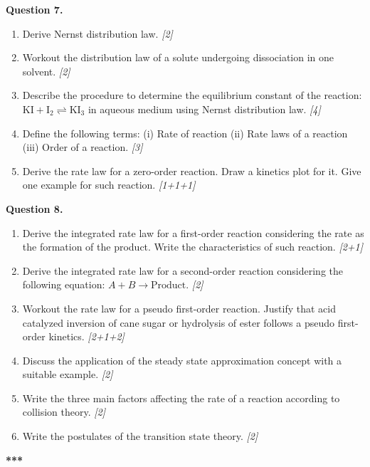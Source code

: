 \documentclass[11pt,a4paper]{article}
\newcommand{\pts}[1]{\hfill \textit{[#1]}}
\begin{document}
\noindent \textbf{Question 7.}
\begin{enumerate}[label=(\alph*)]
  \item Derive Nernst distribution law. \pts{2}
  \item Workout the distribution law of a solute undergoing dissociation in one solvent. \pts{2}
  \item Describe the procedure to determine the equilibrium constant of the reaction: $\text{KI} + \text{I}_2 \rightleftharpoons \text{KI}_3$ in aqueous medium using Nernst distribution law. \pts{4}
  \item Define the following terms: (i) Rate of reaction (ii) Rate laws of a reaction (iii) Order of a reaction. \pts{3}
  \item Derive the rate law for a zero-order reaction. Draw a kinetics plot for it. Give one example for such reaction. \pts{1+1+1}
\end{enumerate}

\bigskip

\noindent \textbf{Question 8.}
\begin{enumerate}[label=(\alph*)]
  \item Derive the integrated rate law for a first-order reaction considering the rate as the formation of the product. Write the characteristics of such reaction. \pts{2+1}
  \item Derive the integrated rate law for a second-order reaction considering the following equation: $A + B \rightarrow \text{Product}$. \pts{2}
  \item Workout the rate law for a pseudo first-order reaction. Justify that acid catalyzed inversion of cane sugar or hydrolysis of ester follows a pseudo first-order kinetics. \pts{2+1+2}
  \item Discuss the application of the steady state approximation concept with a suitable example. \pts{2}
  \item Write the three main factors affecting the rate of a reaction according to collision theory. \pts{2}
  \item Write the postulates of the transition state theory. \pts{2}
\end{enumerate}

\bigskip
\begin{center}
  \textbf{***}
\end{center}
\end{document}
